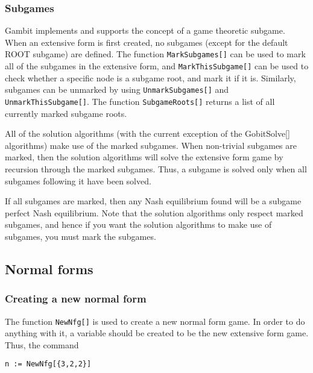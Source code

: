 \subsubsection{Subgames}

Gambit implements and supports the concept of a game theoretic
subgame.  When an extensive form is first created, no subgames (except
for the default ROOT subgame) are defined.  The function
\verb+MarkSubgames[]+ can be used to mark all of the subgames in the
extensive form, and \verb+MarkThisSubgame[]+ can be used to check
whether a specific node is a subgame root, and mark it if it is.
Similarly, subgames can be unmarked by using \verb+UnmarkSubgames[]+
and \verb+UnmarkThisSubgame[]+.  The function \verb+SubgameRoots[]+
returns a list of all currently marked subgame roots.  

All of the solution algorithms (with the current exception of the 
GobitSolve[] algorithms) make use of the marked subgames.  When non-trivial 
subgames are marked, then the solution algorithms will solve the 
extensive form game by recursion through the marked subgames.  Thus, a 
subgame is solved only when all subgames following it have been 
solved.  

If all subgames are marked, then any Nash equilibrium found will be a
subgame perfect Nash equilibrium.  Note that the solution algorithms
only respect marked subgames, and hence if you want the solution
algorithms to make use of subgames, you must mark the subgames.


\subsection{Normal forms}

\subsubsection{Creating a new normal form}

The function \verb+NewNfg[]+ is used to create a new normal form game.
In order to do anything with it, a variable should be created to be
the new extensive form game.  Thus, the command

\begin{verbatim}
n := NewNfg[{3,2,2}]
\end{verbatim}

